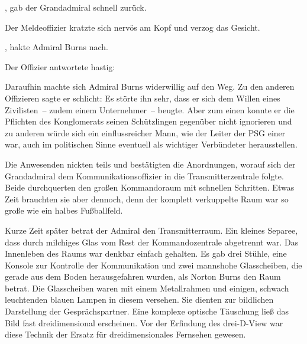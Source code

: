 \par

, gab der Grandadmiral schnell zurück. 

\par

Der Meldeoffizier kratzte sich nervös am Kopf und verzog das Gesicht. 

\par

, hakte Admiral Burns nach.

\par

Der Offizier antwortete hastig: 

\par

Daraufhin machte sich Admiral Burns widerwillig auf den Weg. Zu den anderen Offizieren sagte er schlicht:  Es störte ihn sehr, dass er sich dem Willen eines Zivilisten~-- zudem einem Unternehmer~-- beugte. Aber zum einen konnte er die Pflichten des Konglomerats seinen Schützlingen gegenüber nicht ignorieren und zu anderen würde sich ein einflussreicher Mann, wie der Leiter der PSG einer war, auch im politischen Sinne eventuell als wichtiger Verbündeter herausstellen.

\par

Die Anwesenden nickten teils und bestätigten die Anordnungen, worauf sich der Grandadmiral dem Kommunikationsoffizier in die Transmitterzentrale folgte. Beide durchquerten den großen Kommandoraum mit schnellen Schritten. Etwas Zeit brauchten sie aber dennoch, denn der komplett verkuppelte Raum war so große wie ein halbes Fußballfeld.

\par

Kurze Zeit später betrat der Admiral den Transmitterraum. Ein kleines Separee, dass durch milchiges Glas vom Rest der Kommandozentrale abgetrennt war. Das Innenleben des Raums war denkbar einfach gehalten. Es gab drei Stühle, eine Konsole zur Kontrolle der Kommunikation und zwei mannshohe Glasscheiben, die gerade aus dem Boden herausgefahren wurden, als Norton Burns den Raum betrat. Die Glasscheiben waren mit einem Metallrahmen und einigen, schwach leuchtenden blauen Lampen in diesem versehen. Sie dienten zur bildlichen Darstellung der Gesprächspartner. Eine komplexe optische Täuschung ließ das Bild fast dreidimensional erscheinen. Vor der Erfindung des drei-D-View war diese Technik der Ersatz für dreidimensionales Fernsehen gewesen.

